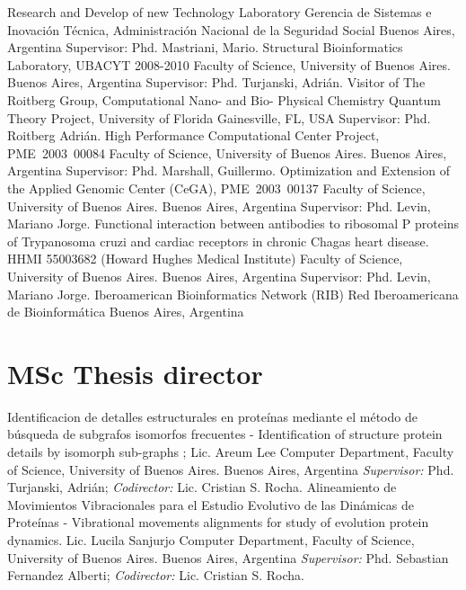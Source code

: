 \documentclass[9pt,a4paper,sans]{moderncv}
\newcommand{\Q}{{\textsf{Q}\hspace*{-1.1ex}%
  \rule{0.15ex}{1.5ex}\hspace*{1.1ex}}}
\newcommand{\Cuat}{º\Q~}
\newcommand{\actual}{$\infty$}
\newcommand{\DC}{Computer Department}
\newcommand{\FCEN}{Faculty of Science}
\newcommand{\UBA}{University of Buenos Aires}
\begin{document}
	{Research and Develop of new Technology Laboratory}
	{Gerencia de Sistemas e Inovación Técnica, Administración Nacional de la Seguridad Social}
	{Buenos Aires, Argentina}
	{}
	{Supervisor: Phd. Mastriani, Mario.}
	{Structural Bioinformatics Laboratory, UBACYT 2008-2010}
	{\FCEN, \UBA.}
	{Buenos Aires, Argentina}
	{}
	{Supervisor: Phd. Turjanski, Adrián.}
\cventry{2\Cuat 2007}
        {Visitor of The Roitberg Group, Computational Nano- and Bio- Physical Chemistry}
	{Quantum Theory Project, University of Florida}
	{Gainesville, FL, USA}
	{}
	{Supervisor: Phd. Roitberg Adrián.}
	{High Performance Computational Center Project, PME~2003~00084}
	{\FCEN, \UBA.}
	{Buenos Aires, Argentina}
	{}
	{Supervisor: Phd. Marshall, Guillermo.}
        {Optimization and Extension of the Applied Genomic Center (CeGA), PME~2003~00137}
	{\FCEN, \UBA.}
	{Buenos Aires, Argentina}
	{}
	{Supervisor: Phd. Levin, Mariano Jorge.}
	{Functional interaction between antibodies to ribosomal P proteins of Trypanosoma cruzi and cardiac receptors in chronic Chagas heart disease. HHMI 55003682 (Howard Hughes Medical Institute)}
	{\FCEN, \UBA.}
	{Buenos Aires, Argentina}
	{}
	{Supervisor: Phd. Levin, Mariano Jorge.}
\cventry{2002-\actual}
	{Iberoamerican Bioinformatics Network (RIB)}
	{Red Iberoamericana de Bioinformática}
	{Buenos Aires, Argentina}
	{}
	{}

	\bibliographyunit
	\begin{bibunit}[plain]
		\nocite{*}
		\putbib[csrocha]
	\end{bibunit}

\section{MSc Thesis director}

	{Identificacion de detalles estructurales en proteínas mediante el método de búsqueda de subgrafos isomorfos frecuentes - Identification of structure protein details by isomorph sub-graphs ; Lic. Areum Lee}
	{\DC, \FCEN, \UBA.}
	{Buenos Aires, Argentina}
	{}
	{\emph{Supervisor:} Phd. Turjanski, Adrián; \emph{Codirector:} Lic. Cristian S. Rocha.}
	{Alineamiento de Movimientos Vibracionales para el Estudio Evolutivo de las Dinámicas de Proteínas - Vibrational movements alignments for study of evolution protein dynamics. Lic. Lucila Sanjurjo} 
	{\DC, \FCEN, \UBA.}
	{Buenos Aires, Argentina}
	{}
	{\emph{Supervisor:} Phd. Sebastian Fernandez Alberti; \emph{Codirector:} Lic. Cristian S. Rocha.}

\label{cientificos:hasta}
\end{document}
